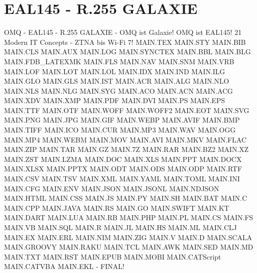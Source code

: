 \documentclass{MAIN}
\begin{document}
\section*{EAL145 - R.255 GALAXIE}
OMQ - EAL145 - R.255 GALAXIE - OMQ ist Galaxie! OMQ ist EAL145!
21 Modern IT Concepts - ZTNA bis Wi-Fi 7!
MAIN.TEX MAIN.STY MAIN.BIB MAIN.CLS MAIN.AUX MAIN.LOG MAIN.SYNCTEX MAIN.BBL MAIN.BLG MAIN.FDB_LATEXMK MAIN.FLS MAIN.NAV MAIN.SNM MAIN.VRB MAIN.LOF MAIN.LOT MAIN.LOL MAIN.IDX MAIN.IND MAIN.ILG MAIN.GLO MAIN.GLS MAIN.IST MAIN.ACR MAIN.ALG MAIN.NLO MAIN.NLS MAIN.NLG MAIN.SYG MAIN.ACO MAIN.ACN MAIN.ACG MAIN.XDV MAIN.XMP MAIN.PDF MAIN.DVI MAIN.PS MAIN.EPS MAIN.TTF MAIN.OTF MAIN.WOFF MAIN.WOFF2 MAIN.EOT MAIN.SVG MAIN.PNG MAIN.JPG MAIN.GIF MAIN.WEBP MAIN.AVIF MAIN.BMP MAIN.TIFF MAIN.ICO MAIN.CUR MAIN.MP3 MAIN.WAV MAIN.OGG MAIN.MP4 MAIN.WEBM MAIN.MOV MAIN.AVI MAIN.MKV MAIN.FLAC MAIN.ZIP MAIN.TAR MAIN.GZ MAIN.7Z MAIN.RAR MAIN.BZ2 MAIN.XZ MAIN.ZST MAIN.LZMA MAIN.DOC MAIN.XLS MAIN.PPT MAIN.DOCX MAIN.XLSX MAIN.PPTX MAIN.ODT MAIN.ODS MAIN.ODP MAIN.RTF MAIN.CSV MAIN.TSV MAIN.XML MAIN.YAML MAIN.TOML MAIN.INI MAIN.CFG MAIN.ENV MAIN.JSON MAIN.JSONL MAIN.NDJSON MAIN.HTML MAIN.CSS MAIN.JS MAIN.PY MAIN.SH MAIN.BAT MAIN.C MAIN.CPP MAIN.JAVA MAIN.RS MAIN.GO MAIN.SWIFT MAIN.KT MAIN.DART MAIN.LUA MAIN.RB MAIN.PHP MAIN.PL MAIN.CS MAIN.FS MAIN.VB MAIN.SQL MAIN.R MAIN.JL MAIN.HS MAIN.ML MAIN.CLJ MAIN.EX MAIN.ERL MAIN.NIM MAIN.ZIG MAIN.V MAIN.D MAIN.SCALA MAIN.GROOVY MAIN.RAKU MAIN.TCL MAIN.AWK MAIN.SED MAIN.MD MAIN.TXT MAIN.RST MAIN.EPUB MAIN.MOBI MAIN.CATScript MAIN.CATVBA MAIN.EKL - FINAL!
\end{document}
